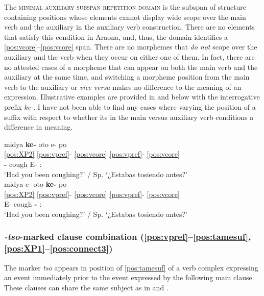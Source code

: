 \documentclass[output=paper,hidelinks]{langscibook}
\begin{document}
The \textsc{minimal auxiliary subspan repetition domain} is the subspan of structure containing positions whose elements cannot display wide scope over the main verb and the auxiliary in the auxiliary verb construction. There are no elements that satisfy this condition in Araona, and, thus, the domain identifies a \ref{pos:vcore}--\ref{pos:vcore} span. There are no morphemes that \textit{do not} scope over the auxiliary and the verb when they occur on either one of them. In fact, there are no attested cases of a morpheme that can appear on both the main verb and the auxiliary at the same time, and switching a morpheme position from the main verb to the auxiliary or \textit{vice versa} makes no difference to the meaning of an expression. Illustrative examples are provided in  and  below with the interrogative prefix \textit{ke-}. I have not been able to find any cases where varying the position of a suffix with respect to whether its in the main versus auxiliary verb conditions a difference in meaning.

\ea 
 \ea \label{ex:keV}
    \glll midya \textbf{ke-} oto e- po \\
    \ref{pos:XP2} \ref{pos:vpref}- \ref{pos:vcore} \ref{pos:vpref}- \ref{pos:vcore}   \\
    \Ssg{} \textbf{\Inter{}-} cough E- \Aux{}:\Intr{} \\
    \glt `Had you been coughing?' / Sp. `¿Estabas tosiendo antes?' \\
 \ex \label{ex:keAux}
    \glll midya	e- oto \textbf{ke-} po \\
    \ref{pos:XP2} \ref{pos:vpref}- \ref{pos:vcore} \ref{pos:vpref}- \ref{pos:vcore} \\
    \Ssg{} E- cough \textbf{\Inter{}-} \Aux{}:\Intr{} \\
    \glt `Had you been coughing?' / Sp. `¿Estabas tosiendo antes?' \\
 \z
\z 

\subsubsection{\textit{-tso}-marked clause combination (\ref{pos:vpref}--\ref{pos:tamesuf},\ref{pos:XP1}--\ref{pos:connect3})}
\label{sec:tso}

The marker \textit{tso} appears in position of \ref{pos:tamesuf} of a verb complex expressing an event immediately prior to the event expressed by the following main clause. These clauses can share the same subject as in  and .
\end{document}
